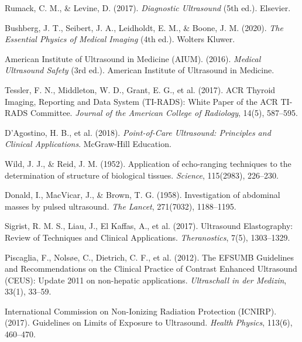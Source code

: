 \documentclass[11pt,a4paper]{article}
\begin{document}
\begin{enumerate}[label={[\arabic*]},leftmargin=*]
    \item Rumack, C. M., \& Levine, D. (2017). \textit{Diagnostic Ultrasound} (5th ed.). Elsevier.
    \item Bushberg, J. T., Seibert, J. A., Leidholdt, E. M., \& Boone, J. M. (2020). \textit{The Essential Physics of Medical Imaging} (4th ed.). Wolters Kluwer.
    \item American Institute of Ultrasound in Medicine (AIUM). (2016). \textit{Medical Ultrasound Safety} (3rd ed.). American Institute of Ultrasound in Medicine.
    \item Tessler, F. N., Middleton, W. D., Grant, E. G., et al. (2017). ACR Thyroid Imaging, Reporting and Data System (TI-RADS): White Paper of the ACR TI-RADS Committee. \textit{Journal of the American College of Radiology}, 14(5), 587--595.
    \item D'Agostino, H. B., et al. (2018). \textit{Point-of-Care Ultrasound: Principles and Clinical Applications}. McGraw-Hill Education.
    \item Wild, J. J., \& Reid, J. M. (1952). Application of echo-ranging techniques to the determination of structure of biological tissues. \textit{Science}, 115(2983), 226--230.
    \item Donald, I., MacVicar, J., \& Brown, T. G. (1958). Investigation of abdominal masses by pulsed ultrasound. \textit{The Lancet}, 271(7032), 1188--1195.
    \item Sigrist, R. M. S., Liau, J., El Kaffas, A., et al. (2017). Ultrasound Elastography: Review of Techniques and Clinical Applications. \textit{Theranostics}, 7(5), 1303--1329.
    \item Piscaglia, F., Nolsøe, C., Dietrich, C. F., et al. (2012). The EFSUMB Guidelines and Recommendations on the Clinical Practice of Contrast Enhanced Ultrasound (CEUS): Update 2011 on non-hepatic applications. \textit{Ultraschall in der Medizin}, 33(1), 33--59.
    \item International Commission on Non-Ionizing Radiation Protection (ICNIRP). (2017). Guidelines on Limits of Exposure to Ultrasound. \textit{Health Physics}, 113(6), 460--470.
\end{enumerate}
\end{document}

